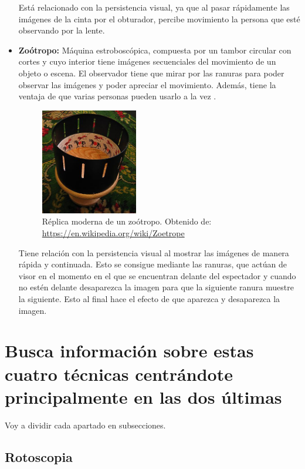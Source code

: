 \documentclass{article}
\begin{document}
\begin{itemize}
    Está relacionado con la persistencia visual, ya que al pasar rápidamente las imágenes de la cinta por el obturador, percibe movimiento la persona que esté observando por la lente. 

    \newpage
    \item \textbf{Zoótropo: }Máquina estroboscópica, compuesta por un tambor circular con cortes y cuyo interior tiene imágenes secuenciales del movimiento de un objeto o escena. El observador tiene que mirar por las ranuras para poder observar las imágenes y poder apreciar el movimiento. Además, tiene la ventaja de que varias personas pueden usarlo a la vez \cite{zoo}.
    
	\begin{figure}[H]
	    \centering
	    \includegraphics[width=0.4\textwidth]{imagenes/Zoetrope.jpg}
        \caption{Réplica moderna de un zoótropo. Obtenido de: \url{https://en.wikipedia.org/wiki/Zoetrope}}
	\end{figure}

    Tiene relación con la persistencia visual al mostrar las imágenes de manera rápida y continuada. Esto se consigue mediante las ranuras, que actúan de visor en el momento en el que se encuentran delante del espectador y cuando no estén delante desaparezca la imagen para que la siguiente ranura muestre la siguiente. Esto al final hace el efecto de que aparezca y desaparezca la imagen.
\end{itemize}


\section{Busca información sobre estas cuatro técnicas centrándote principalmente en las dos últimas}

Voy a dividir cada apartado en subsecciones.

\subsection{Rotoscopia}
\end{document}
